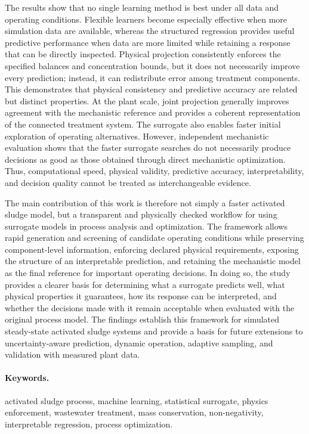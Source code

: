 \documentclass[12pt,twoside]{book}
\begin{document}
The results show that no single learning method is best under all data and operating conditions. Flexible learners become especially effective when more simulation data are available, whereas the structured regression provides useful predictive performance when data are more limited while retaining a response that can be directly inspected. Physical projection consistently enforces the specified balances and concentration bounds, but it does not necessarily improve every prediction; instead, it can redistribute error among treatment components. This demonstrates that physical consistency and predictive accuracy are related but distinct properties. At the plant scale, joint projection generally improves agreement with the mechanistic reference and provides a coherent representation of the connected treatment system. The surrogate also enables faster initial exploration of operating alternatives. However, independent mechanistic evaluation shows that the faster surrogate searches do not necessarily produce decisions as good as those obtained through direct mechanistic optimization. Thus, computational speed, physical validity, predictive accuracy, interpretability, and decision quality cannot be treated as interchangeable evidence.

The main contribution of this work is therefore not simply a faster activated sludge model, but a transparent and physically checked workflow for using surrogate models in process analysis and optimization. The framework allows rapid generation and screening of candidate operating conditions while preserving component-level information, enforcing declared physical requirements, exposing the structure of an interpretable prediction, and retaining the mechanistic model as the final reference for important operating decisions. In doing so, the study provides a clearer basis for determining what a surrogate predicts well, what physical properties it guarantees, how its response can be interpreted, and whether the decisions made with it remain acceptable when evaluated with the original process model. The findings establish this framework for simulated steady-state activated sludge systems and provide a basis for future extensions to uncertainty-aware prediction, dynamic operation, adaptive sampling, and validation with measured plant data.

\paragraph*{Keywords.} activated sludge process, machine learning, statistical surrogate, physics enforcement, wastewater treatment, mass conservation, non-negativity, interpretable regression, process optimization.
\end{document}
